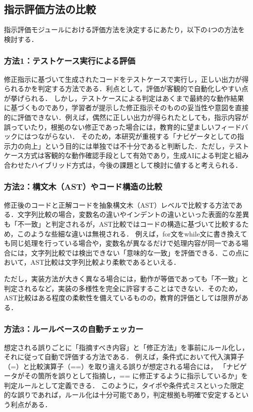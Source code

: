 \documentclass[twoside,twocolumn,10pt]{jsarticle}
\begin{document}
\subsection {指示評価方法の比較}
指示評価モジュールにおける評価方法を決定するにあたり，以下の4つの方法を検討する．

\subsubsection*{方法1：テストケース実行による評価}
修正指示に基づいて生成されたコードをテストケースで実行し，正しい出力が得られるかを判定する方法である．利点として，評価が客観的で自動化しやすい点が挙げられる．  
しかし，テストケースによる判定はあくまで最終的な動作結果に基づくものであり，学習者が提示した修正指示そのものの妥当性や意図を直接的に評価できない．例えば，偶然に正しい出力が得られたとしても，指示内容が誤っていたり，根拠のない修正であった場合には，教育的に望ましいフィードバックにはつながらない．  
そのため，本研究が重視する「ナビゲータとしての指示力の向上」という目的には単独では不十分であると判断した．ただし，テストケース方式は客観的な動作確認手段として有効であり，生成AIによる判定と組み合わせたハイブリッド方式は，今後の課題として検討に値すると考えられる．

\subsubsection*{方法2：構文木（AST）やコード構造の比較}
修正後のコードと正解コードを抽象構文木（AST）レベルで比較する方法である．文字列比較の場合，変数名の違いやインデントの違いといった表面的な差異も「不一致」と判定されるが，AST比較ではコードの構造に基づいて比較するため，このような些細な違いは無視される．  
例えば，for文をwhile文に書き換えても同じ処理を行っている場合や，変数名が異なるだけで処理内容が同一である場合には，文字列比較では検出できない「意味的な一致」を評価できる．この点において，AST比較は文字列比較より柔軟であるといえる．  

ただし，実装方法が大きく異なる場合には，動作が等価であっても「不一致」と判定されるなど，実装の多様性を完全に許容することはできない．そのため，AST比較はある程度の柔軟性を備えているものの，教育的評価としては限界がある．


\subsubsection*{方法3：ルールベースの自動チェッカー}
想定される誤りごとに「指摘すべき内容」と「修正方法」を事前にルール化し，それに従って自動で評価する方法である．  
例えば，条件式において代入演算子（=）と比較演算子（==）を取り違える誤りが想定される場合には，  
「ナビゲータがその箇所を誤りとして指摘し，== に修正するように指示しているか」を判定ルールとして定義できる．  
このように，タイポや条件式ミスといった限定的な誤りであれば，ルール化は十分可能であり，判定根拠も明確で安定するという利点がある．
\end{document}
